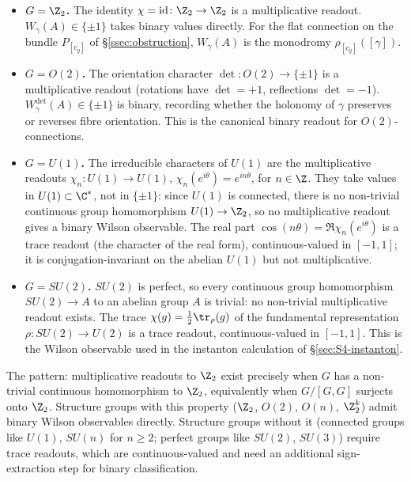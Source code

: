 \begin{itemize}[leftmargin=2em]
\item \textbf{$G=\Z_2$.} The identity $\chi=\mathrm{id}\colon\Z_2
\to\Z_2$ is a multiplicative readout. $W_\gamma(A)\in\{\pm 1\}$
takes binary values directly. For the flat connection on the bundle
$P_{[c_y]}$ of \S\ref{ssec:obstruction}, $W_\gamma(A)$ is the
monodromy $\rho_{[c_y]}([\gamma])$.

\item \textbf{$G=O(2)$.} The orientation character $\det\colon O(2)
\to\{\pm 1\}$ is a multiplicative readout (rotations have
$\det=+1$, reflections $\det=-1$). $W_\gamma^{\det}(A)\in\{\pm 1\}$
is binary, recording whether the holonomy of $\gamma$ preserves or
reverses fibre orientation. This is the canonical binary readout for
$O(2)$-connections.

\item \textbf{$G=U(1)$.} The irreducible characters of $U(1)$ are
the multiplicative readouts $\chi_n\colon U(1)\to U(1)$,
$\chi_n(e^{i\theta})=e^{in\theta}$, for $n\in\Z$. They take values in
$U(1)\subset\C^*$, not in $\{\pm 1\}$: since $U(1)$ is connected,
there is no non-trivial continuous group homomorphism
$U(1)\to\Z_2$, so no multiplicative readout gives a binary Wilson
observable. The real part $\cos(n\theta)=\Re\chi_n(e^{i\theta})$ is a
trace readout (the character of the real form), continuous-valued
in $[-1,1]$; it is conjugation-invariant on the abelian $U(1)$ but
not multiplicative.

\item \textbf{$G=SU(2)$.} $SU(2)$ is perfect, so every continuous
group homomorphism $SU(2)\to A$ to an abelian group $A$ is trivial:
no non-trivial multiplicative readout exists. The trace
$\chi(g)=\tfrac12\tr_\rho(g)$ of the fundamental representation
$\rho\colon SU(2)\to U(2)$ is a trace readout, continuous-valued in
$[-1,1]$. This is the Wilson observable used in the instanton
calculation of \S\ref{sec:S4-instanton}.
\end{itemize}

The pattern: multiplicative readouts to $\Z_2$ exist precisely when
$G$ has a non-trivial continuous homomorphism to $\Z_2$, equivalently
when $G/[G,G]$ surjects onto $\Z_2$. Structure groups with this
property ($\Z_2$, $O(2)$, $O(n)$, $\Z_2^k$) admit binary Wilson
observables directly. Structure groups without it (connected groups
like $U(1)$, $SU(n)$ for $n\geq 2$; perfect groups like $SU(2)$,
$SU(3)$) require trace readouts, which are continuous-valued and
need an additional sign-extraction step for binary classification.

